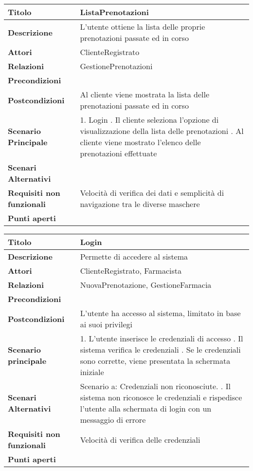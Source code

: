 \begin{tabular} {|P{4.5cm}|P{12.5cm}|}
\hline
  \textbf{Titolo} & ListaPrenotazioni\\
\hline
  \textbf{Descrizione} & L'utente ottiene la lista delle proprie prenotazioni passate ed in corso\\
\hline
 \textbf{Attori} & ClienteRegistrato\\
\hline
  \textbf{Relazioni} & GestionePrenotazioni\\
\hline
  \textbf{Precondizioni} &\\
\hline
  \textbf{Postcondizioni} & Al cliente viene mostrata la lista delle prenotazioni passate ed in corso\\
\hline
  \textbf{Scenario Principale} & 1. Login . Il cliente seleziona
  l'opzione di visualizzazione della lista delle prenotazioni . Al cliente
  viene mostrato l'elenco delle prenotazioni effettuate\\
\hline
  \textbf{Scenari Alternativi} &\\
\hline
  \textbf{Requisiti non funzionali} & Velocità di verifica dei dati e semplicità di navigazione tra le diverse maschere\\
\hline
  \textbf{Punti aperti} &\\
\hline
\end{tabular}
\hfill
\break

\begin{tabular} {|P{4.5cm}|P{12.5cm}|}
\hline
  \textbf{Titolo} & Login\\
\hline
  \textbf{Descrizione} & Permette di accedere al sistema\\
\hline
  \textbf{Attori} & ClienteRegistrato, Farmacista\\
\hline
  \textbf{Relazioni} & NuovaPrenotazione, GestioneFarmacia\\
\hline
  \textbf{Precondizioni} &\\
\hline
  \textbf{Postcondizioni} & L'utente ha accesso al sistema, limitato in base ai suoi privilegi\\
\hline
  \textbf{Scenario principale} & 1. L'utente inserisce le credenziali di
  accesso . Il sistema verifica le credenziali . Se le
  credenziali sono corrette, viene presentata la schermata iniziale\\
\hline
  \textbf{Scenari Alternativi} & Scenario a: Credenziali non riconosciute.
  . Il sistema non riconosce le credenziali e rispedisce l'utente
  alla schermata di login con un messaggio di errore\\
\hline
  \textbf{Requisiti non funzionali} & Velocità di verifica delle credenziali\\
\hline
  \textbf{Punti aperti} &\\
\hline
\end{tabular}
\hfill
\break

